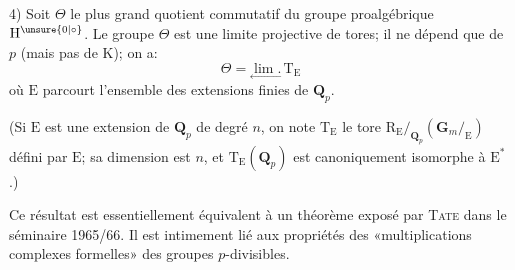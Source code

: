 4) Soit $\Theta$ le plus grand quotient commutatif du groupe proalgébrique $\mathrm H^{\unsure{0|\circ}}$. Le groupe $\Theta$ est une limite projective de tores; il ne dépend que de $p$ (mais pas de $\mathrm K$); on a:
\[
\Theta=\underset{\leftarrow}{\lim.}\,\mathrm T_{\mathrm E}
\]
où $\mathrm E$ parcourt l'ensemble des extensions finies de $\mathbf Q_p$.

(Si $\mathrm E$ est une extension de $\mathbf Q_p$ de degré $n$, on note $\mathrm T_{\mathrm E}$ le tore $\mathrm R_{\mathrm E}/_{\mathbf Q_p}(\mathbf G_m/_{\mathrm E})$ défini par $\mathrm E$; sa dimension est $n$, et $\mathrm T_{\mathrm E}(\mathbf Q_p)$ est canoniquement isomorphe à $\mathrm E^*$.)

Ce résultat est essentiellement équivalent à un théorème exposé par \textsc{Tate} dans le séminaire 1965/66. Il est intimement lié aux propriétés des «multiplications complexes formelles» des groupes $p$-divisibles.
